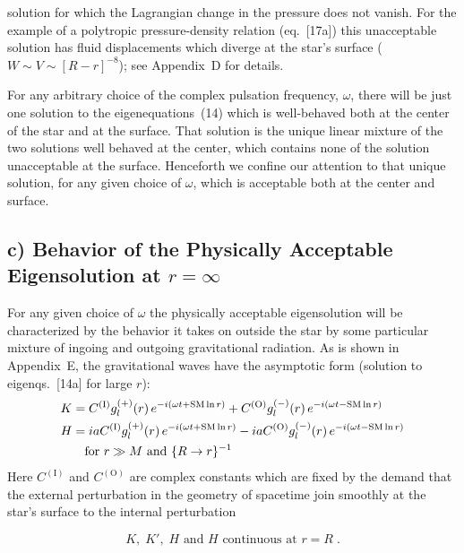 
solution for which the Lagrangian change in the pressure does not vanish. For the
example of a polytropic pressure-density relation (eq.~[17a]) this unacceptable solution has
fluid displacements which diverge at the star's surface ($W \sim V \sim [R - r]^{-8}$); see
Appendix~D for details.

For any arbitrary choice of the complex pulsation frequency, $\omega$, there will be just one
solution to the eigenequations~(14) which is well-behaved both at the center of the star
and at the surface. That solution is the unique linear mixture of the two solutions
well behaved at the center, which contains none of the solution unacceptable at the
surface. Henceforth we confine our attention to that unique solution, for any given
choice of $\omega$, which is acceptable both at the center and surface.

\subsection*{c) Behavior of the Physically Acceptable Eigensolution at $r = \infty$}

For any given choice of $\omega$ the physically acceptable eigensolution will be
characterized by the behavior it takes on outside the star by some particular mixture of
ingoing and outgoing gravitational radiation. As is shown in Appendix~E, the gravitational
waves have the asymptotic form (solution to eigenqs.~[14a] for large $r$):
\begin{align}
K &= C^{(\mathrm{I})} g_l^{(+)}(r)\, e^{-i(\omega t + \text{SM}\ln r)} + C^{(\mathrm{O})} g_l^{(-)}(r)\, e^{-i(\omega t - \text{SM}\ln r)} \notag \\
H &= i a C^{(\mathrm{I})} g_l^{(+)}(r)\, e^{-i(\omega t + \text{SM}\ln r)} - i a C^{(\mathrm{O})} g_l^{(-)}(r)\, e^{-i(\omega t - \text{SM}\ln r)} \notag \\
&\quad \text{for } r \gg M \text{ and } \{R \to r\}^{-1} \notag
\end{align}
\begin{equation}
\label{eq:18}
\tag{18}
\end{equation}
Here $C^{(\mathrm{I})}$ and $C^{(\mathrm{O})}$ are complex constants which are fixed by the demand that the
external perturbation in the geometry of spacetime join smoothly at the star's surface
to the internal perturbation

\begin{equation}
K,\; K',\; H \text{ and } H \text{ continuous at } r = R \;.
\label{eq:19}
\tag{19}
\end{equation}


